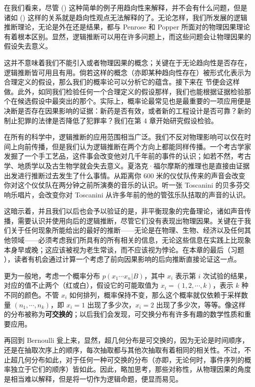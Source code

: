 在我们看来，尽管 (\in[3-38]) 这种简单的例子用趋向性来解释，并不会有什么问题，但是诸如 (\in[3-40]) 这样的关系就是趋向性观点无法解释的了。无论怎样，我们所发展的逻辑推断理论，无论是外在还是结果，都与 Penrose 和 Popper 所面对的物理因果理论有着根本区别。显然，逻辑推断可以用在许多问题上，而这些问题会让物理因果的假设失去意义。

这并不意味着我们不能引入或者物理因果的概念；关键在于无论趋向性是否存在，逻辑推断皆可用且有用。倘若这样的概念（亦即某种趋向性存在）被形式化表示为合理定义的假设，那么我们的概率论可以分析它的蕴含。接下来在 \in[sec-3-10] 节便会这样做。此外，如同我们检验任何一个合理定义的假设那样，我们也能根据证据检验那个在候选假设中最突出的那个。实际上，概率论最常见也是最重要的一项应用便是决断是否存在因果影响的证据：新药是否有效，或者新的工程设计是否可靠？新的制止犯罪的法律是否降低了犯罪率？我们在第 4 章开始研究假设检验。

在所有的科学中，逻辑推断的应用范围相当广泛。我们不反对物理影响可以仅在时间上向前传播，但是我们认为逻辑推断在两个方向上都能同样传播。一个考古学家发掘了一个手工艺品，这件事会改变他对几千年前的事件的认识；如若不然，考古学、地质学以及古生物学就会失去意义。夏洛克·福尔摩斯的推理也是直接由证据出发进行推断过去发生了什么事情。从距离你 600 米的仪仗队传来的声音会改变你对这个仪仗队在两分钟之前所演奏的音乐的认识。听一张 Toscanini 的贝多芬交响乐唱片，会改变你对 Toscanini 从许多年前的他的管弦乐队拮取的声音的认识。

这暗示着，并且我们以后也会予以验证的是，非平衡现象的完备理论，诸如声音传播，需要认识并使用向后的逻辑推断，尽管它们没有表现出物理因果。关键在于我们关于任何现象所能给出的最好的推断——无论是在物理、生物、经济以及任何其他领域——必须考虑我们所具有的所有相关的信息，无论这些信息在实践上比现象本身早或晚；这应该被视为老生常谈，而不应该视为悖论。在本章的最后（习题 \in[ex-3-6]），读者有机会通过计算一个考虑了前向因果影响的后向推断直接论证这一点。

更为一般地，考虑一个概率分布 $p(x_1\cdots x_n|B)$，其中 $x_i$ 表示第 $i$ 次试验的结果，对应的值不止两个（红或白），假设它的可能取值为 $x_i = (1,2,\cdots, k)$，表示 $k$ 种不同的颜色。不管 $x_i$ 如何排列，概率保持不变，那么这个概率就仅依赖于采样数量 $(n_1,\cdots,n_k)$，即 $x_i = 1$ 出现了多少次，$x_i = 2$ 出现了多少次，等等。像这样的分布被称为{\bf 可交换的}；以后我们会发现，可交换分布有许多有趣的数学性质和重要应用。

再回到 Bernoulli 瓮上来，显然，超几何分布是可交换的，因为无论是时间顺序，还是在抽取次序上的顺序，每次抽取都与其他次抽取有着相同的相关性。不过，不止超几何分布如此，对于任何一种可交换的分布（亦即，无论何时，事件序列的概率独立于它们的顺序）皆如此。因此，略加思考，那些对称性，从物理因果的角度是相当难以解释，但是将一切作为逻辑命题，便显而易见。

